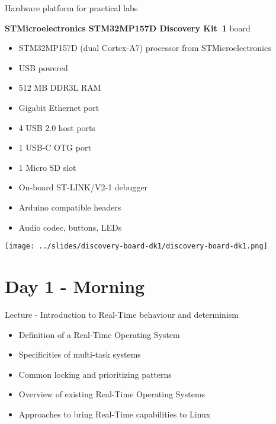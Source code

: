 \documentclass[a4paper,12pt,obeyspaces,spaces,hyphens]{article}
\begin{document}
\feshowtitle

\certificate{}
\disabilities{}

\feagendatwocolumn
{Hardware platform for practical labs}
{
  {\bf STMicroelectronics STM32MP157D Discovery Kit~1} board
  \begin{itemize}
  \item STM32MP157D (dual Cortex-A7) processor from STMicroelectronics
  \item USB powered
  \item 512 MB DDR3L RAM
  \item Gigabit Ethernet port
  \item 4 USB 2.0 host ports
  \item 1 USB-C OTG port
  \item 1 Micro SD slot
  \item On-board ST-LINK/V2-1 debugger
  \item Arduino compatible headers
  \item Audio codec, buttons, LEDs
  \end{itemize}
}
{}
{
  \begin{center}
    \texttt{[image: ../slides/discovery-board-dk1/discovery-board-dk1.png]}
  \end{center}
}

\section{Day 1 - Morning}

\feagendaonecolumn
{Lecture - Introduction to Real-Time behaviour and determinism}
{
  \begin{itemize}
  \item Definition of a Real-Time Operating System
  \item Specificities of multi-task systems
  \item Common locking and prioritizing patterns
  \item Overview of existing Real-Time Operating Systems
  \item Approaches to bring Real-Time capabilities to Linux
  \end{itemize}
}
\end{document}
